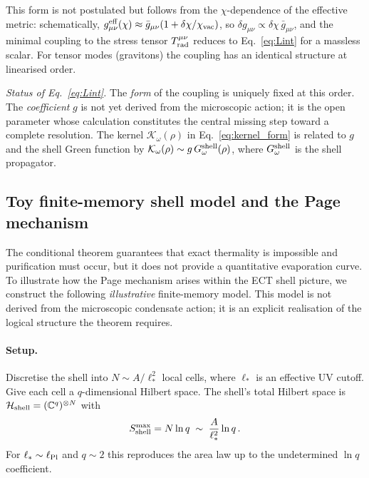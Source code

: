 \documentclass[11pt,a4paper]{article}
\numberwithin{equation}{section}
\begin{document}
This form is not postulated but follows from the $\chi$-dependence of
the effective metric: schematically,
$g_{\mu\nu}^{\rm eff}(\chi) \approx \bar g_{\mu\nu}(1 + \delta\chi/\chi_{\rm vac})$,
so $\delta g_{\mu\nu} \propto \delta\chi\,\bar g_{\mu\nu}$,
and the minimal coupling to the stress tensor $T^{\mu\nu}_{\rm rad}$
reduces to Eq.~\eqref{eq:Lint} for a massless scalar.
For tensor modes (gravitons) the coupling has an identical structure
at linearised order.

\textit{Status of Eq.~\eqref{eq:Lint}.}
The \emph{form} of the coupling is uniquely fixed at this order.
The \emph{coefficient} $g$ is not yet derived from the microscopic action;
it is the open parameter whose calculation constitutes the central missing
step toward a complete resolution.
The kernel $\mathcal{K}_\omega(\rho)$ in Eq.~\eqref{eq:kernel_form} is
related to $g$ and the shell Green function by
$\mathcal{K}_\omega(\rho) \sim g\,G_\omega^{\rm shell}(\rho)$,
where $G_\omega^{\rm shell}$ is the shell propagator.

\subsection{Toy finite-memory shell model and the Page mechanism}
\label{app:page_toy}

The conditional theorem guarantees that exact thermality is impossible and
purification must occur, but it does not provide a quantitative evaporation
curve.
To illustrate how the Page mechanism arises within the ECT shell picture, we
construct the following \emph{illustrative} finite-memory model.
This model is not derived from the microscopic condensate action; it is an
explicit realisation of the logical structure the theorem requires.

\paragraph{Setup.}
Discretise the shell into $N \sim A/\ell_*^2$ local cells, where $\ell_*$ is
an effective UV cutoff.
Give each cell a $q$-dimensional Hilbert space.
The shell's total Hilbert space is
$\mathcal{H}_{\rm shell} = (\mathbb{C}^q)^{\otimes N}$
with
\begin{equation}
S_{\rm shell}^{\max}
=
N\ln q
\;\sim\;
\frac{A}{\ell_*^2}\ln q\,.
\label{eq:Sshell_max}
\end{equation}
For $\ell_* \sim \ell_{\rm Pl}$ and $q \sim 2$ this reproduces the area
law up to the undetermined $\ln q$ coefficient.
\end{document}
